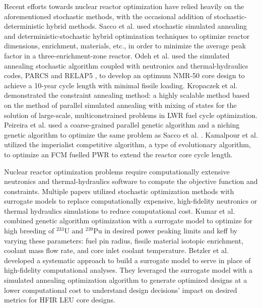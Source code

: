 Recent efforts towards nuclear reactor optimization have relied heavily on 
the aforementioned stochastic methods, with the occasional addition of 
stochastic-deterministic hybrid methods. 
Sacco et al. \cite{sacco_two_2006,sacco_metropolis_2008} used stochastic 
simulated annealing and deterministic-stochastic hybrid optimization techniques 
to optimize reactor dimensions, enrichment, materials, etc., in order to 
minimize the average peak factor in a three-enrichment-zone reactor. 
Odeh et al. \cite{odeh_core_2016} used the simulated annealing stochastic algorithm 
coupled with neutronics and thermal-hydraulics codes, \gls{PARCS} and RELAP5
\cite{fletcher_relap5mod3_1992}, to develop an optimum \gls{NMR-50} core design 
to achieve a 10-year cycle length with minimal fissile loading. 
Kropaczek et al. \cite{kropaczek_large-scale_2019} demonstrated the constraint 
annealing method: a highly scalable method based on the method of parallel 
simulated annealing with mixing of states \cite{kropaczek_constraint_2019} for 
the solution of large-scale, multiconstrained problems in \gls{LWR} fuel cycle 
optimization. 
Peireira et al. \cite{pereira_coarse-grained_2003,pereira_parallel_2008} 
used a coarse-grained parallel genetic algorithm and a niching genetic algorithm
to optimize the same problem as Sacco et al. \cite{sacco_two_2006}. 
Kamalpour et al. \cite{kamalpour_smart_2020} utilized the imperialist competitive 
algorithm, a type of evolutionary algorithm, to optimize an \gls{FCM} fuelled 
\gls{PWR} to extend the reactor core cycle length. 

Nuclear reactor optimization problems require computationally 
extensive neutronics and thermal-hydraulics software to compute the objective 
function and constraints. 
Multiple papers utilized stochastic optimization methods with surrogate models 
to replace computationally expensive, high-fidelity neutronics or thermal hydraulics 
simulations to reduce computational cost.
Kumar et al. \cite{kumar_new_2015} combined genetic algorithm optimization 
with a surrogate model to optimize for high breeding of $^{233}$U and $^{239}$Pu 
in desired power peaking limits and keff by varying these parameters: fuel pin 
radius,  fissile material isotopic enrichment, coolant mass flow rate, and 
core inlet coolant temperature.
Betzler et al. \cite{betzler_design_2019} developed a systematic approach to 
build a surrogate model to serve in place of high-fidelity computational 
analyses. 
They leveraged the surrogate model with a simulated annealing optimization 
algorithm to generate optimized designs at a lower computational cost to 
understand design decisions' impact on desired metrics for \gls{HFIR} \gls{LEU} 
core designs.

